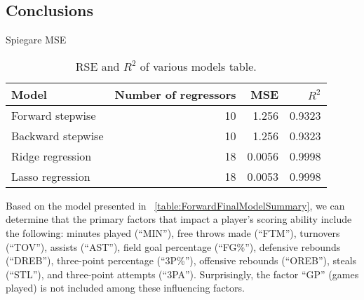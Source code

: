 \subsection{Conclusions}

Spiegare MSE

\begin{table}[H]
	\centering
	\begin{tabular}{|| l | r | r | r ||} 
		\hline
		Model & Number of regressors & MSE & $R^2$ \\
		\hline
		Forward stepwise & 10 & 1.256 & 0.9323 \\
		\hline
		Backward stepwise & 10 & 1.256 & 0.9323 \\
		\hline
		Ridge regression & 18 & 0.0056 & 0.9998 \\
		\hline
		Lasso regression & 18 & 0.0053 & 0.9998 \\
		\hline
	\end{tabular}
	\caption{RSE and $R^2$ of various models table.}
	\label{table:RegEvalParams}
\end{table}

Based on the model presented in \Tab~\ref{table:ForwardFinalModelSummary}, we can determine that the primary factors that impact a player's scoring ability include the following: minutes played (``MIN''), free throws made (``FTM''), turnovers (``TOV''), assists (``AST''), field goal percentage (``FG\%''), defensive rebounds (``DREB''), three-point percentage (``3P\%''), offensive rebounds (``OREB''), steals (``STL''), and three-point attempts (``3PA'').
Surprisingly, the factor ``GP'' (games played) is not included among these influencing factors.